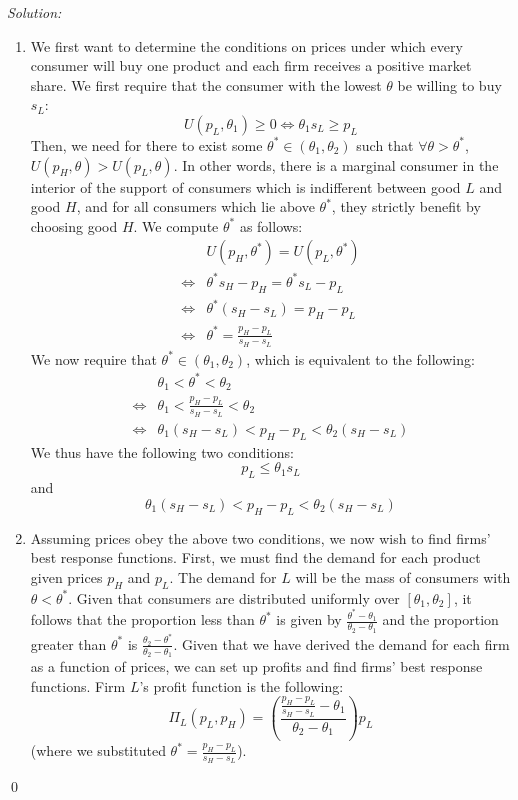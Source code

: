 \documentclass[12pt]{article}
\newenvironment{sol}
    {\emph{Solution:}
    }
    {
    \qed
    }
\begin{document}
\begin{sol}
    \begin{enumerate}[label=\alph*) ]
        \item We first want to determine the conditions on prices under which every consumer will buy one product and each firm receives a positive market share. We first require that the consumer with the lowest $\theta$ be willing to buy $s_L$:
        \[U(p_L, \theta_1) \geq 0 \iff \theta_1 s_L \geq p_L\]
        Then, we need for there to exist some $\theta^* \in (\theta_1, \theta_2)$ such that $\forall \theta > \theta^*$, $U(p_H, \theta) > U(p_L, \theta)$. In other words, there is a marginal consumer in the interior of the support of consumers which is indifferent between good $L$ and good $H$, and for all consumers which lie above $\theta^*$, they strictly benefit by choosing good $H$. We compute $\theta^*$ as follows:
        \begin{align*}
            &U(p_H, \theta^*) = U(p_L, \theta^*) \\
            \iff& \theta^* s_H - p_H = \theta^* s_L - p_L\\
            \iff& \theta^*(s_H - s_L) = p_H - p_L\\
            \iff& \theta^* = \frac{p_H - p_L}{s_H - s_L}
        \end{align*}
        We now require that $\theta^* \in (\theta_1, \theta_2)$, which is equivalent to the following:
        \begin{align*}
            &\theta_1 < \theta^* < \theta_2\\
             \iff &\theta_1 < \frac{p_H - p_L}{s_H - s_L} < \theta_2\\
             \iff & \theta_1 (s_H - s_L) < p_H - p_L < \theta_2 (s_H - s_L)
        \end{align*}
        We thus have the following two conditions:
        \[p_L \leq \theta_1 s_L\]
        and
        \[ \theta_1 (s_H - s_L) < p_H - p_L < \theta_2 (s_H - s_L)\]
        \item Assuming prices obey the above two conditions, we now wish to find firms' best response functions. First, we must find the demand for each product given prices $p_H$ and $p_L$. The demand for $L$ will be the mass of consumers with $\theta < \theta^*$. Given that consumers are distributed uniformly over $[\theta_1, \theta_2]$, it follows that the proportion less than $\theta^*$ is given by $\frac{\theta^* - \theta_1}{\theta_2 - \theta_1}$ and the proportion greater than $\theta^*$ is $\frac{\theta_2 - \theta^*}{\theta_2 - \theta_1}$. Given that we have derived the demand for each firm as a function of prices, we can set up profits and find firms' best response functions. Firm $L$'s profit function is the following:
        \[\Pi_L(p_L, p_H) =\left(\frac{ \frac{p_H - p_L}{s_H - s_L} - \theta_1}{\theta_2 - \theta_1} \right)p_L \]
        (where we substituted $\theta^* = \frac{p_H - p_L}{s_H - s_L}$).


\end{enumerate}
\end{sol}
\end{document}
